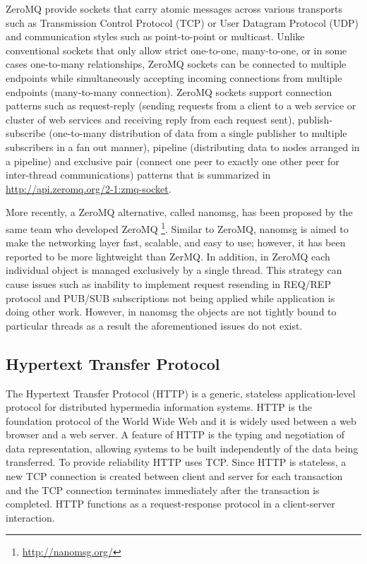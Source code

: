 \documentclass[a4paper,11pt,twoside]{article}
\begin{document}
ZeroMQ provide sockets that carry atomic messages across various transports such as Transmission Control Protocol (TCP) or User Datagram Protocol (UDP) and communication styles such as point-to-point or multicast. Unlike conventional sockets that only allow strict one-to-one, many-to-one, or in some cases one-to-many relationships, ZeroMQ sockets can be connected to multiple endpoints while simultaneously accepting incoming connections from multiple endpoints (many-to-many connection). ZeroMQ sockets support connection patterns such as request-reply (sending requests from a client to a web service or cluster of web services and receiving reply from each request sent), publish-subscribe (one-to-many distribution of data from a single publisher to multiple subscribers in a fan out manner), pipeline (distributing data to nodes arranged in a pipeline) and exclusive pair (connect one peer to exactly one other peer for inter-thread communications) patterns that is summarized in \url{http://api.zeromq.org/2-1:zmq-socket}.      

More recently, a ZeroMQ alternative, called nanomsg, has been proposed by the same team who developed ZeroMQ \footnote{\label{nanomsg} \url{http://nanomsg.org/}}. Similar to ZeroMQ, nanomsg is aimed to make the networking layer fast, scalable, and easy to use; however, it has been reported to be more lightweight than ZerMQ. In addition, in ZeroMQ each individual object is managed exclusively by a single thread. This strategy can cause issues such as inability to implement request resending in REQ/REP protocol and PUB/SUB subscriptions not being applied while application is doing other work. However, in nanomsg the objects are not tightly bound to particular threads as a result the aforementioned issues do not exist. 


\subsection{Hypertext Transfer Protocol} \label{HTTP}
The Hypertext Transfer Protocol (HTTP) is a generic, stateless application-level protocol for distributed hypermedia information systems. HTTP is the foundation protocol of the World Wide Web and it is widely used between a web browser and a web server. A feature of HTTP is the typing and negotiation of data representation, allowing systems to be built independently of the data being transferred.  To provide reliability HTTP uses TCP. Since HTTP is stateless, a new TCP connection is created between client and server for each transaction and the TCP connection terminates immediately after the transaction is completed. HTTP functions as a request-response protocol in a client-server interaction. 
\end{document}
